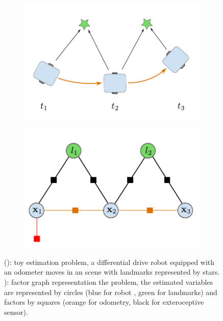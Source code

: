 \begin{figure}[h]
    \centering
    \begin{subfigure}{.49\linewidth}
        \centering
        \includegraphics[width=\textwidth]{figures/toy_example.pdf}
        \caption{\label{fig:toy_problem}}
    \end{subfigure}%
    \hfill
    \begin{subfigure}{.49\linewidth}
        \centering
        \includegraphics[width=\textwidth]{figures/toy_factor.pdf}
        \caption{\label{fig:toy_factor}}
    \end{subfigure}%
    \caption{(): toy estimation problem, a differential drive robot equipped with an odometer moves in 
    an scene with landmarks represented by stars. ): factor graph representation the problem, the estimated variables are represented by circles 
    (blue for robot \keyframe, green for landmarks) and factors by squares (orange for odometry, black for exteroceptive sensor).}
\end{figure}

